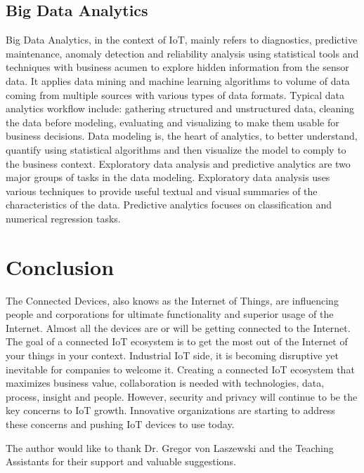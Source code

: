 \documentclass[sigconf]{acmart}
\begin{document}
	\subsection{Big Data Analytics}
	Big Data Analytics, in the context of IoT, mainly refers to diagnostics, predictive maintenance, anomaly detection and reliability analysis using statistical tools and techniques with business acumen to explore hidden information from the sensor data. It applies data mining and machine learning algorithms to volume of data coming from multiple sources with various types of data formats. Typical data analytics workflow include: gathering structured and unstructured data, cleaning the data before modeling, evaluating and visualizing to make them usable for business decisions. Data modeling is, the heart of analytics, to better understand, quantify using statistical algorithms and then visualize the model to comply to the business context. Exploratory data analysis and predictive analytics are two major groups of tasks in the data modeling. Exploratory data analysis uses various techniques to provide useful textual and visual summaries of the characteristics of the data. Predictive analytics focuses on classification and numerical regression tasks. 
	
	
	\section{Conclusion}	
	
	
	The Connected Devices, also knows as the Internet of Things, are influencing people and corporations for ultimate functionality and superior usage of the Internet. Almost all the devices are or will be getting connected to the Internet. The goal of a connected IoT ecosystem is to get the most out of the Internet of your things in your context. Industrial IoT side, it is becoming disruptive yet inevitable for companies to welcome it. Creating a connected IoT ecosystem that maximizes business value, collaboration is needed with technologies, data, process, insight and people. However, security and privacy will continue to be the key concerns to IoT growth. Innovative organizations are starting to address these concerns and pushing IoT devices to use today.
	
	\begin{acks}		
	
		The author would like to thank Dr. Gregor von Laszewski and the Teaching Assistants for their support and valuable suggestions.
		
	\end{acks}

	
	 
	

	
\end{document}
